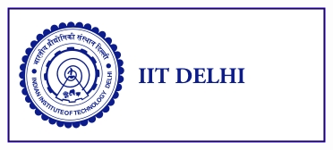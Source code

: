 \documentclass[final]{beamer}
\newlength{\sepwid}
\newlength{\onecolwid}
\begin{document}
\begin{frame}
\begin{columns}[t]
\begin{column}{\onecolwid}






\begin{center}
\includegraphics[width=0.5\linewidth]{img/iitd_logo.jpg}
\end{center}





\end{column} %

\begin{column}{\sepwid}\end{column} %

\end{columns} %

\end{frame} %
\end{document}
